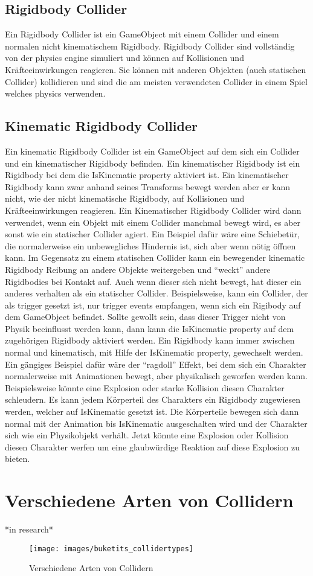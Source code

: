 \subsection{Rigidbody Collider}
Ein Rigidbody Collider ist ein GameObject mit einem Collider und einem normalen nicht kinematischem Rigidbody. Rigidbody Collider sind vollständig von der physics engine simuliert und können auf Kollisionen und Kräfteeinwirkungen reagieren. Sie können mit anderen Objekten (auch statischen Collider) kollidieren und sind die am meisten verwendeten Collider in einem Spiel welches physics verwenden.

\subsection{Kinematic Rigidbody Collider}
Ein kinematic Rigidbody Collider ist ein GameObject auf dem sich ein Collider und ein kinematischer Rigidbody befinden. Ein kinematischer Rigidbody ist ein Rigidbody bei dem die IsKinematic property aktiviert ist. Ein kinematischer Rigidbody kann zwar anhand seines Transforms bewegt werden aber er kann nicht, wie der nicht kinematische Rigidbody, auf Kollisionen und Kräfteeinwirkungen reagieren. Ein Kinematischer Rigidbody Collider wird dann verwendet, wenn ein Objekt mit einem Collider manchmal bewegt wird, es aber sonst wie ein statischer Collider agiert.
Ein Beispiel dafür wäre eine Schiebetür, die normalerweise ein unbewegliches Hindernis ist, sich aber wenn nötig öffnen kann. Im Gegensatz zu einem statischen Collider kann ein bewegender kinematic Rigidbody Reibung an andere Objekte weitergeben und "`weckt"' andere Rigidbodies bei Kontakt auf.
Auch wenn dieser sich nicht bewegt, hat dieser ein anderes verhalten als ein statischer Collider. Beispielsweise, kann ein Collider, der als trigger gesetzt ist, nur trigger events empfangen, wenn sich ein Rigibody auf dem GameObject befindet. Sollte gewollt sein, dass dieser Trigger nicht von Physik beeinflusst werden kann, dann kann die IsKinematic property auf dem zugehörigen Rigidbody aktiviert werden. Ein Rigidbody kann immer zwischen normal und kinematisch, mit Hilfe der IsKinematic property, gewechselt werden. Ein gängiges Beispiel dafür wäre der "`ragdoll"' Effekt, bei dem sich ein Charakter normalerweise mit Animationen bewegt, aber physikalisch geworfen werden kann. Beispielsweise könnte eine Explosion oder starke Kollision diesen Charakter schleudern. Es kann jedem Körperteil des Charakters ein Rigidbody zugewiesen werden, welcher auf IsKinematic gesetzt ist. Die Körperteile bewegen sich dann normal mit der Animation bis IsKinematic ausgeschalten wird und der Charakter sich wie ein Physikobjekt verhält. Jetzt könnte eine Explosion oder Kollision diesen Charakter werfen um eine glaubwürdige Reaktion auf diese Explosion zu bieten.
\cite{_staticCollider}

\section{Verschiedene Arten von Collidern}
*in research*
\begin{figure}[h]
	\centering
	\texttt{[image: images/buketits\_collidertypes]}
	\caption{Verschiedene Arten von Collidern}
\end{figure}
\cite{dickinson2015unity}